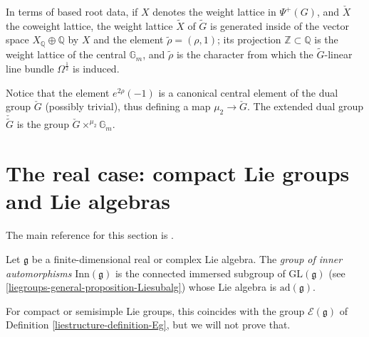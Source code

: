 \begin{remark}
 \label{remark-Cgroup-rootdata}
In terms of based root data, if $X$ denotes the weight lattice in $\Psi^+(G)$, and $\check X$ the coweight lattice, the weight lattice $\tilde X$ of $\tilde G$ is generated inside of the vector space $X_{\mathbb Q} \oplus \mathbb Q$ by $X$ and the element $\tilde\rho = (\rho, 1)$; its projection $\mathbb Z\subset \mathbb Q$ is the weight lattice of the central $\mathbb G_m$, and $\tilde\rho$ is the character from which the $\tilde G$-linear line bundle $\Omega^\frac{1}{2}$ is induced. 

Notice that the element $e^{2\rho}(-1)$ is a canonical central element of the dual group $\check G$ (possibly trivial), thus defining a map $\mu_2\to \check G$. The extended dual group $\check{\tilde G}$ is the group $\check G \times^{\mu_2} \mathbb G_m$. 
\end{remark}





\section{The real case: compact Lie groups and Lie algebras}
\label{section-real-compact}

The main reference for this section is \cite[Ch.\ IX \S 1]{Bourbaki-Lie}.

\begin{definition}
 \label{definition-Inng}
Let $\mathfrak g$ be a finite-dimensional real or complex Lie algebra. The {\it group of inner automorphisms} $\text{Inn}(\mathfrak g)$ is the connected immersed subgroup of $\text{GL}(\mathfrak g)$ (see \ref{liegroups-general-proposition-Liesubalg}) whose Lie algebra is $\text{ad}(\mathfrak g)$.
\end{definition}

For compact or semisimple Lie groups, this coincides with the group $\mathcal E(\mathfrak g)$ of Definition \ref{liestructure-definition-Eg}, but we will not prove that.



